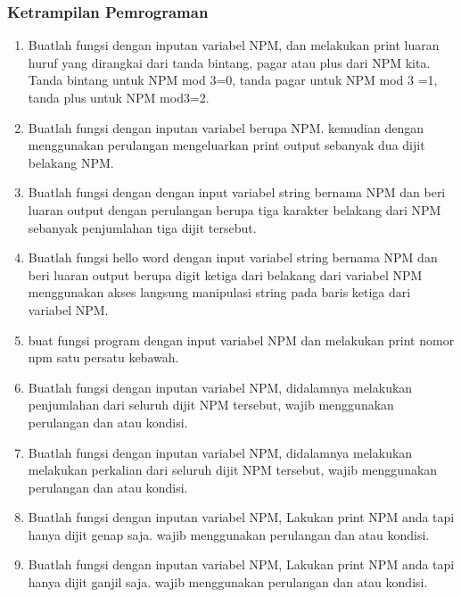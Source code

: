 \subsubsection{Ketrampilan Pemrograman}
\begin{enumerate}
    \item Buatlah fungsi dengan inputan variabel NPM, dan melakukan print luaran huruf yang dirangkai dari tanda bintang, pagar atau plus dari NPM kita. Tanda bintang untuk NPM mod 3=0, tanda pagar untuk NPM mod 3 =1, tanda plus untuk NPM mod3=2.
    
    \item Buatlah fungsi dengan inputan variabel berupa NPM. kemudian dengan menggunakan perulangan mengeluarkan print output sebanyak dua dijit belakang  NPM.
    
    \item Buatlah fungsi dengan dengan input variabel string bernama NPM dan beri luaran output dengan perulangan berupa tiga karakter belakang dari NPM sebanyak penjumlahan tiga dijit tersebut.
    
    \item Buatlah fungsi hello word dengan input variabel string bernama NPM dan beri luaran output berupa digit ketiga dari belakang dari variabel NPM menggunakan akses langsung manipulasi string pada baris ketiga dari variabel NPM.
    
    \item buat fungsi program dengan input variabel NPM dan melakukan print nomor npm satu persatu kebawah.
    
    \item Buatlah fungsi dengan inputan variabel NPM, didalamnya melakukan penjumlahan dari seluruh dijit NPM tersebut, wajib menggunakan perulangan dan atau kondisi.
    
    \item Buatlah fungsi dengan inputan variabel NPM, didalamnya melakukan melakukan perkalian dari seluruh dijit NPM tersebut, wajib menggunakan perulangan dan atau kondisi.
    
    \item Buatlah fungsi dengan inputan variabel NPM, Lakukan print NPM anda tapi hanya dijit genap saja. wajib menggunakan perulangan dan atau kondisi.
    
    \item Buatlah fungsi dengan inputan variabel NPM, Lakukan print NPM anda tapi hanya dijit ganjil saja. wajib menggunakan perulangan dan atau kondisi.

\end{enumerate}
